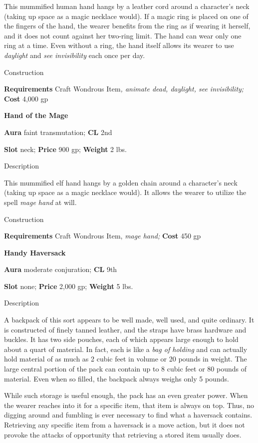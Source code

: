 This mummified human hand hangs by a leather cord around a character's neck (taking up space as a magic necklace would). If a magic ring is placed on one of the fingers of the hand, the wearer benefits from the ring as if wearing it herself, and it does not count against her two-ring limit. The hand can wear only one ring at a time. Even without a ring, the hand itself allows its wearer to use \textit{daylight} and \textit{see invisibility} each once per day. 
				
Construction
				
\textbf{Requirements} Craft Wondrous Item\textit{, animate dead, daylight, see invisibility;}\textbf{ Cost }4,000 gp
				
\textbf{Hand of the Mage}
				
\textbf{Aura} faint transmutation;\textbf{ CL }2nd
				
\textbf{Slot} neck; \textbf{Price} 900 gp; \textbf{Weight} 2 lbs.
				
Description
				
This mummified elf hand hangs by a golden chain around a character's neck (taking up space as a magic necklace would). It allows the wearer to utilize the spell \textit{mage hand} at will. 
				
Construction
				
\textbf{Requirements} Craft Wondrous Item,\textit{ mage hand;}\textbf{ Cost }450 gp
				
\textbf{Handy Haversack}
				
\textbf{Aura} moderate conjuration;\textbf{ CL }9th
				
\textbf{Slot} none; \textbf{Price} 2,000 gp; \textbf{Weight} 5 lbs.
				
Description
				
A backpack of this sort appears to be well made, well used, and quite ordinary. It is constructed of finely tanned leather, and the straps have brass hardware and buckles. It has two side pouches, each of which appears large enough to hold about a quart of material. In fact, each is like a \textit{bag of holding} and can actually hold material of as much as 2 cubic feet in volume or 20 pounds in weight. The large central portion of the pack can contain up to 8 cubic feet or 80 pounds of material. Even when so filled, the backpack always weighs only 5 pounds.
				
While such storage is useful enough, the pack has an even greater power. When the wearer reaches into it for a specific item, that item is always on top. Thus, no digging around and fumbling is ever necessary to find what a haversack contains. Retrieving any specific item from a haversack is a move action, but it does not provoke the attacks of opportunity that retrieving a stored item usually does. 
				

